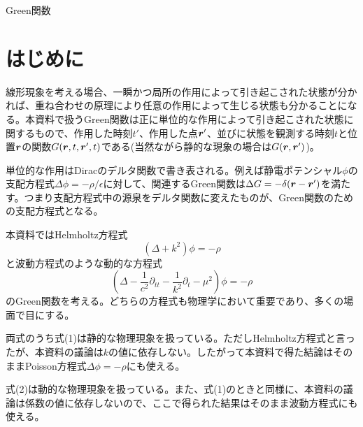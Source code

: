 \documentclass[dvipdfmx, 9pt, a4paper]{jsarticle}
\newcommand{\bm}[1]{{\mbox{\boldmath $#1$}}}
\begin{document}
\begin{center}
{\fontsize{18pt}{1pt}\selectfont Green関数}\\
\end{center}
\section*{はじめに}
線形現象を考える場合、一瞬かつ局所の作用によって引き起こされた状態が分かれば、重ね合わせの原理により任意の作用によって生じる状態も分かることになる。本資料で扱うGreen関数は正に単位的な作用によって引き起こされた状態に関するもので、作用した時刻$t'$、作用した点$\bm r'$、並びに状態を観測する時刻$t$と位置$\bm r$の関数$G(\bm r, t, \bm r', t)$である(当然ながら静的な現象の場合は$G(\bm r, \bm r')$)。\par
単位的な作用はDiracのデルタ関数で書き表される。例えば静電ポテンシャル$\phi$の支配方程式$\Delta \phi=-\rho/\epsilon$に対して、関連するGreen関数は$\Delta G=-\delta(\bm r-\bm r')$を満たす。つまり支配方程式中の源泉をデルタ関数に変えたものが、Green関数のための支配方程式となる。\par
本資料ではHelmholtz方程式
\begin{equation}
(\Delta+k^2)\phi=-\rho
\end{equation}
と波動方程式のような動的な方程式
\begin{equation}
\left(\Delta -\frac{1}{c^2}\partial_{tt}-\frac{1}{k^2}\partial_t-\mu^2 \right)\phi=-\rho
\end{equation}
のGreen関数を考える。どちらの方程式も物理学において重要であり、多くの場面で目にする。\par
両式のうち式(1)は静的な物理現象を扱っている。ただしHelmholtz方程式と言ったが、本資料の議論は$k$の値に依存しない。したがって本資料で得た結論はそのままPoisson方程式$\Delta \phi=-\rho$にも使える。\par
式(2)は動的な物理現象を扱っている。また、式(1)のときと同様に、本資料の議論は係数の値に依存しないので、ここで得られた結果はそのまま波動方程式にも使える。
\end{document}
